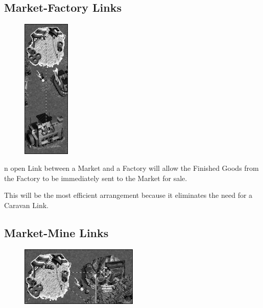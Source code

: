 \subsection{\textsf{Market-Factory Links}}


\begin{figure}
    \vspace{-20pt}
    \begin{center}
        \includegraphics[width=0.2\textwidth]{Ilink_factorymarket} %
    \end{center}
    \vspace{-20pt}
\end{figure}

n open Link between a Market and a Factory will allow the Finished Goods from the Factory to be immediately sent to the Market for sale.

This will be the most efficient arrangement because it eliminates the need for a Caravan Link.

\clearpage

\subsection{\textsf{Market-Mine Links}}


\begin{figure}
    \vspace{-20pt}
    \begin{center}
        \includegraphics[width=0.5\textwidth]{Ilink_marketmine} %
    \end{center}
    \vspace{-10pt}
\end{figure}

